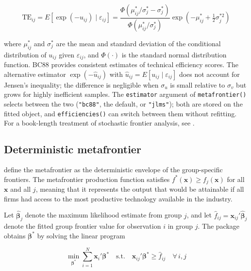 \begin{equation}
\text{TE}_{ij} = E\!\left[\exp(-u_{ij}) \mid \varepsilon_{ij}\right]
= \frac{\Phi\!\left(\mu^*_{ij}/\sigma^*_j - \sigma^*_j\right)}
       {\Phi\!\left(\mu^*_{ij}/\sigma^*_j\right)}
  \exp\!\left(-\mu^*_{ij} + \tfrac{1}{2}\sigma^{*2}_j\right)
\label{eq:te}
\end{equation}

where \(\mu^*_{ij}\) and \(\sigma^*_j\) are the mean and standard deviation of
the conditional distribution of \(u_{ij}\) given \(\varepsilon_{ij}\), and
\(\Phi(\cdot)\) is the standard normal distribution function. BC88 provides
consistent estimates of technical efficiency scores. The alternative
estimator \(\exp(-\widehat{u}_{ij})\) with
\(\widehat{u}_{ij} = E[u_{ij} \mid \varepsilon_{ij}]\) \citep[JLMS]{jondrow1982}
does not account for Jensen's inequality; the difference is negligible when
\(\sigma_u\) is small relative to \(\sigma_v\) but grows for highly inefficient
samples. The \texttt{estimator} argument of \texttt{metafrontier()} selects between the
two (\texttt{"bc88"}, the default, or \texttt{"jlms"}); both are stored on the fitted
object, and \texttt{efficiencies()} can switch between them without refitting. For
a book-length treatment of stochastic frontier analysis, see
\citet{kumbhakar2000}.

\subsection{Deterministic metafrontier}\label{sec:det-metafrontier}

\citeauthor{battese2004} \citetext{\citeyear{battese2004}; \citealp[building on][]{battese2002}} define the metafrontier as the deterministic envelope of the
group-specific frontiers. The metafrontier production function satisfies
\(f^*(\mathbf{x}) \geq f_j(\mathbf{x})\) for all \(\mathbf{x}\) and all \(j\),
meaning that it represents the output that would be attainable if all firms
had access to the most productive technology available in the industry.

Let \(\widehat{\boldsymbol{\beta}}_j\) denote the maximum likelihood estimate from
group \(j\), and let \(\widehat{f}_{ij} = \mathbf{x}_{ij}'\widehat{\boldsymbol{\beta}}_j\)
denote the fitted group frontier value for observation \(i\) in group \(j\).
The  package obtains \(\boldsymbol{\beta}^*\) by solving
the linear program

\begin{equation}
\min_{\boldsymbol{\beta}^*} \sum_{i=1}^{N}
\mathbf{x}_{i}'\boldsymbol{\beta}^*
\quad \text{s.t.} \quad
\mathbf{x}_{ij}'\boldsymbol{\beta}^* \geq \widehat{f}_{ij}
\quad \forall\, i, j
\label{eq:deterministic}
\end{equation}

